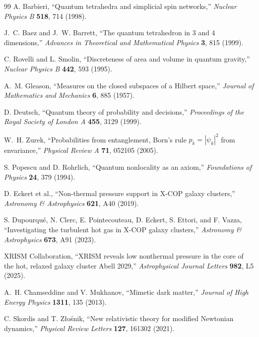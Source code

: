 \documentclass[11pt]{article}
\begin{document}
\begin{thebibliography}{99}
A. Barbieri,
``Quantum tetrahedra and simplicial spin networks,''
\emph{Nuclear Physics B} \textbf{518}, 714 (1998).

J.~C. Baez and J.~W. Barrett,
``The quantum tetrahedron in 3 and 4 dimensions,''
\emph{Advances in Theoretical and Mathematical Physics} \textbf{3}, 815 (1999).

C. Rovelli and L. Smolin,
``Discreteness of area and volume in quantum gravity,''
\emph{Nuclear Physics B} \textbf{442}, 593 (1995).

A.~M. Gleason,
``Measures on the closed subspaces of a Hilbert space,''
\emph{Journal of Mathematics and Mechanics} \textbf{6}, 885 (1957).

D. Deutsch,
``Quantum theory of probability and decisions,''
\emph{Proceedings of the Royal Society of London A} \textbf{455}, 3129 (1999).

W.~H. Zurek,
``Probabilities from entanglement, Born's rule $p_k=|\psi_k|^2$ from envariance,''
\emph{Physical Review A} \textbf{71}, 052105 (2005).

S. Popescu and D. Rohrlich,
``Quantum nonlocality as an axiom,''
\emph{Foundations of Physics} \textbf{24}, 379 (1994).

D. Eckert et al.,
``Non-thermal pressure support in X-COP galaxy clusters,''
\emph{Astronomy \& Astrophysics} \textbf{621}, A40 (2019).

S. Dupourqu\'e, N. Clerc, E. Pointecouteau, D. Eckert, S. Ettori, and F. Vazza,
``Investigating the turbulent hot gas in X-COP galaxy clusters,''
\emph{Astronomy \& Astrophysics} \textbf{673}, A91 (2023).

XRISM Collaboration,
``XRISM reveals low nonthermal pressure in the core of the hot, relaxed galaxy cluster Abell 2029,''
\emph{Astrophysical Journal Letters} \textbf{982}, L5 (2025).

A.~H. Chamseddine and V. Mukhanov,
``Mimetic dark matter,''
\emph{Journal of High Energy Physics} \textbf{1311}, 135 (2013).

C. Skordis and T. Z\l o\'snik,
``New relativistic theory for modified Newtonian dynamics,''
\emph{Physical Review Letters} \textbf{127}, 161302 (2021).


\end{thebibliography}
\end{document}
